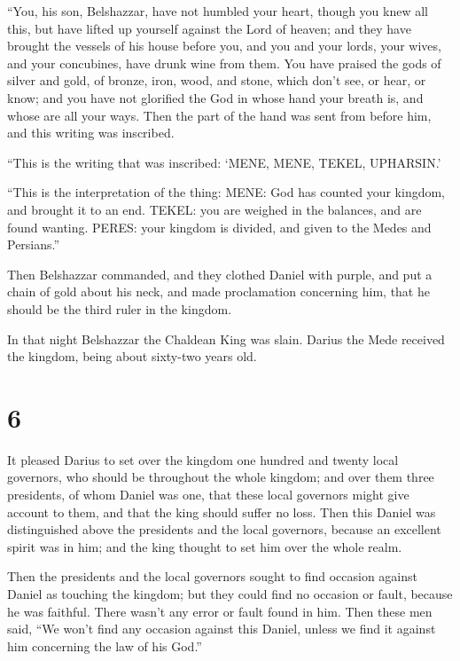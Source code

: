  ``You, his son, Belshazzar, have not humbled your heart,
though you knew all this,  but have lifted up yourself
against the Lord of heaven; and they have brought the vessels of his
house before you, and you and your lords, your wives, and your
concubines, have drunk wine from them. You have praised the gods of
silver and gold, of bronze, iron, wood, and stone, which don't see, or
hear, or know; and you have not glorified the God in whose hand your
breath is, and whose are all your ways.  Then the part of
the hand was sent from before him, and this writing was inscribed.

 ``This is the writing that was inscribed: `MENE, MENE,
TEKEL, UPHARSIN.'

 ``This is the interpretation of the thing: MENE: God has
counted your kingdom, and brought it to an end.  TEKEL:
you are weighed in the balances, and are found wanting. 
PERES: your kingdom is divided, and given to the Medes and Persians.''

 Then Belshazzar commanded, and they clothed Daniel with
purple, and put a chain of gold about his neck, and made proclamation
concerning him, that he should be the third ruler in the kingdom.

 In that night Belshazzar the Chaldean King was slain.
 Darius the Mede received the kingdom, being about
sixty-two years old.

\hypertarget{section-5}{%
\section{6}\label{section-5}}

 It pleased Darius to set over the kingdom one hundred and
twenty local governors, who should be throughout the whole kingdom;
 and over them three presidents, of whom Daniel was one,
that these local governors might give account to them, and that the king
should suffer no loss.  Then this Daniel was distinguished
above the presidents and the local governors, because an excellent
spirit was in him; and the king thought to set him over the whole realm.

 Then the presidents and the local governors sought to
find occasion against Daniel as touching the kingdom; but they could
find no occasion or fault, because he was faithful. There wasn't any
error or fault found in him.  Then these men said, ``We
won't find any occasion against this Daniel, unless we find it against
him concerning the law of his God.''

